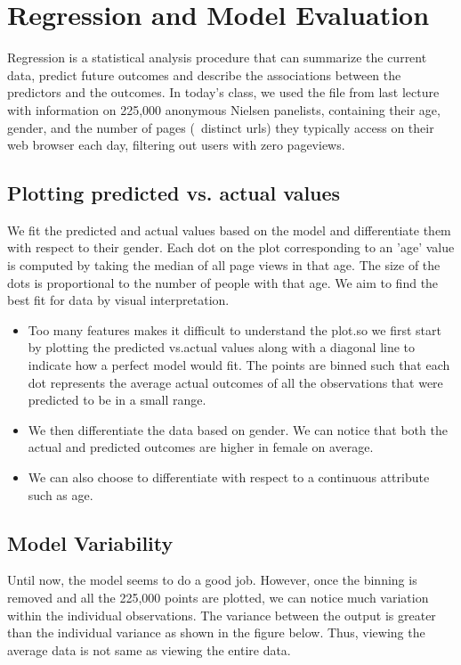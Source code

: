
\section{Regression and Model Evaluation} 
    Regression is a statistical analysis procedure that can
summarize the current data, predict future outcomes and describe the associations between the predictors and the outcomes. In today's class, we used the file from last lecture with information on 225,000 anonymous Nielsen panelists, containing their age, gender, and the number of pages (~distinct urls) they typically access on their web browser each day, filtering out users with zero pageviews.


\subsection{Plotting predicted vs. actual values}

We fit the predicted and actual values based on the model and differentiate them with respect to their gender. Each dot on the plot corresponding to an 'age' value is computed by taking the median of all page views in that age. The size of the dots is proportional to the number of people with that age. We aim to find the best fit for data by visual interpretation.

\begin{itemize}
  \item Too many features makes it difficult to understand the plot.so we first start by plotting the predicted vs.actual values along with a diagonal line to indicate how a perfect model would fit. The points are binned such that each dot represents the average actual outcomes of all the observations that were predicted to be in a small range.
  \item  We then differentiate the data based on gender. We can notice that both the actual and predicted outcomes are higher in female on average.
  \item We can also choose to differentiate with respect to a continuous attribute such as age.
\end{itemize}

\subsection{Model Variability}
Until now, the model seems to do a good job. However, once the binning is removed and all the 225,000 points are plotted, we can notice much variation within the individual observations. The variance between the output is greater than the individual variance as shown in the figure below. Thus, viewing the average data is not same as viewing the entire data. \\


